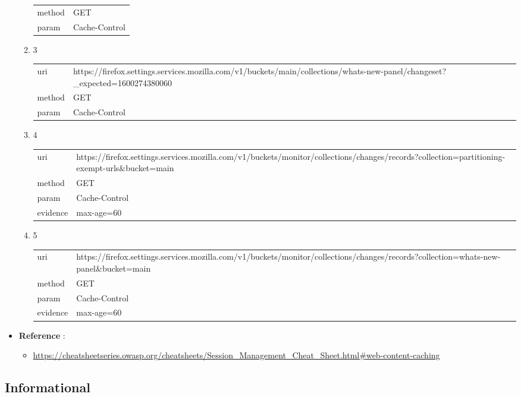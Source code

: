 \documentclass[10pt]{article}
\begin{document}
\begin{itemize}
\begin{enumerate}
\begin{tabular}{| l | p{12cm}}
method & GET \\
param & Cache-Control \\
\end{tabular}
\item[] 3
\begin{tabular}{| l | p{12cm}}
uri & https://firefox.settings.services.mozilla.com/v1/buckets/main/collections/whats-new-panel/changeset?\_expected=1600274380060 \\
method & GET \\
param & Cache-Control \\
\end{tabular}
\item[] 4
\begin{tabular}{| l | p{12cm}}
uri & https://firefox.settings.services.mozilla.com/v1/buckets/monitor/collections/changes/records?collection=partitioning-exempt-urls\&bucket=main \\
method & GET \\
param & Cache-Control \\
evidence & max-age=60 \\
\end{tabular}
\item[] 5
\begin{tabular}{| l | p{12cm}}
uri & https://firefox.settings.services.mozilla.com/v1/buckets/monitor/collections/changes/records?collection=whats-new-panel\&bucket=main \\
method & GET \\
param & Cache-Control \\
evidence & max-age=60 \\
\end{tabular}
\end{enumerate}
\item[] \textbf{Reference} : 
\begin{itemize}
\item \url{https://cheatsheetseries.owasp.org/cheatsheets/Session\_Management\_Cheat\_Sheet.html\#web-content-caching}
\end{itemize}
\end{itemize}
\subsection{Informational}
\end{document}
